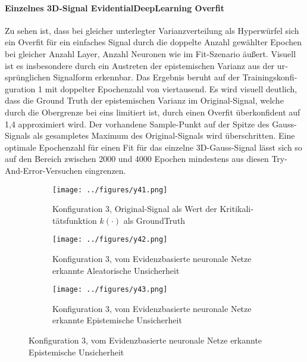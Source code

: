 \begin{otherlanguage}{ngerman}
\paragraph{Einzelnes 3D-Signal \gls{EvidentialDeepLearning} Overfit} Zu sehen ist, dass bei gleicher unterlegter Varianzverteilung als Hyperwürfel sich ein Overfit für ein einfaches Signal durch die doppelte Anzahl gewählter Epochen bei gleicher Anzahl Layer, Anzahl Neuronen wie im Fit-Szenario äußert. Visuell ist es insbesondere durch ein Austreten der epistemischen Varianz aus der ursprünglichen Signalform erkennbar. Das Ergebnis beruht auf der Trainingskonfiguration 1 mit doppelter Epochenzahl von viertausend. Es wird visuell deutlich, dass die Ground Truth der epistemischen Varianz im Original-Signal, welche durch die Obergrenze bei eins limitiert ist, durch einen Overfit überkonfident auf 1,4 approximiert wird. Der vorhandene Sample-Punkt auf der Spitze des Gauss-Signals als gesampletes Maximum des Original-Signals wird überschritten. Eine optimale Epochenzahl für einen Fit für das einzelne 3D-Gauss-Signal lässt sich so auf den Bereich zwischen 2000 und 4000 Epochen mindestens aus diesen Try-And-Error-Versuchen eingrenzen.



\begin{figure}[!ht]
  \centering

  \begin{subfigure}[t]{\textwidth}
    \centering
    \texttt{[image: ../figures/y41.png]}
    \caption{Konfiguration 3, Original-Signal als Wert der Kritikalitätsfunktion \(k(\cdot)\) als \gls{GroundTruth}}
    \label{fig:bild31}
  \end{subfigure}

  \vspace{0.5em}

  \begin{subfigure}[t]{\textwidth}
    \centering
    \texttt{[image: ../figures/y42.png]}
    \caption{Konfiguration 3, vom \gls{Evidenzbasierte neuronale Netze} erkannte \gls{Aleatorische Unsicherheit}}
    \label{fig:bild32}
  \end{subfigure}

  \vspace{0.5em}

  \begin{subfigure}[t]{\textwidth}
    \centering
    \texttt{[image: ../figures/y43.png]}
    \caption{Konfiguration 3, vom \gls{Evidenzbasierte neuronale Netze} erkannte \gls{Epistemische Unsicherheit}}
    \label{fig:bild33}
  \end{subfigure}


\end{figure}
\end{otherlanguage}
